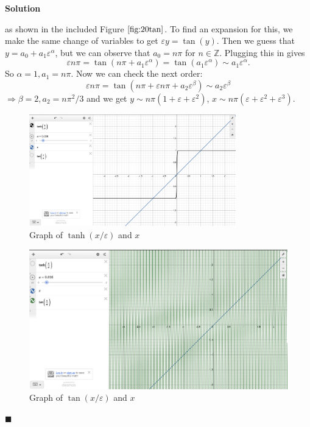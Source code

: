 \documentclass[11pt]{article}
\newcommand{\vep}{\varepsilon}
\theoremstyle{problemstyle}
\newenvironment{solution}
  {\noindent\textbf{Solution}\quad}
  {\hfill$\blacksquare$\par\vspace{1em}}
\begin{document}
\begin{solution}
\begin{enumerate}
      as shown in the included Figure $\ref{fig:20tan}$. To find an expansion
      for this, we make the same change of variables to get $\vep y = \tan(y)$.
      Then we guess that $y = a_0 + a_1\vep^\alpha$, but we can observe that
      $a_0 = n\pi$ for $n \in \mathbb{Z}$. Plugging this in gives
      \[ \vep n \pi = \tan(n\pi + a_1\vep^\alpha) = \tan(a_1\vep^\alpha) \sim
      a_1\vep^\alpha. \]
      So $\alpha = 1, a_1 = n\pi$. Now we can check the next order:
      \[ \vep n \pi = \tan(n\pi + \vep n \pi + a_2 \vep^\beta) \sim
      a_2\vep^\beta \]
      \( \Rightarrow \beta = 2, a_2 = n\pi^2/3 \) and we get $y \sim n\pi(1 +
      \vep + \vep^2)$, $x \sim n\pi(\vep + \vep^2 + \vep^3)$.
  \end{enumerate}

  \begin{figure}
    \centering
    \includegraphics[width=0.8\textwidth]{20_tanh.png}
    \caption{Graph of $\tanh(x/\vep)$ and $x$}
    \label{fig:20tanh}
  \end{figure}
  \begin{figure}
    \centering
    \includegraphics[width=.8\textwidth]{20_tan.png}
    \caption{Graph of $\tan(x/\vep)$ and $x$}
    \label{fig:20tan}
  \end{figure}
\end{solution}
\end{document}
